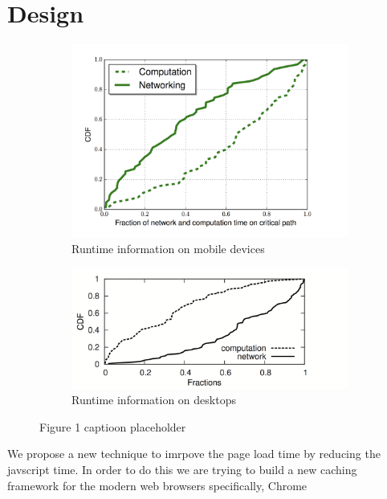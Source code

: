 \section{Design}
\label{sec:design}

\begin{figure}[!h]
\begin{subfigure}[h]{0.5\textwidth}
\centering
\includegraphics[width=\linewidth]{figs/comp_net.png}
\caption{Runtime information on mobile devices}
\label{fig:mobile-runtime}
\end{subfigure}
\begin{subfigure}[h]{0.5\textwidth}
\centering
\includegraphics[width=\linewidth]{figs/comp_net_desk.png}
\caption{Runtime information on desktops}
\label{fig:mobile-runtime}
\end{subfigure}
\caption{{\color{red}Figure 1 captioon placeholder}}
\end{figure}
We propose a new technique to imrpove the page load time by reducing
the javscript time.  In order to do this we are trying to build a new
caching framework for the modern web browsers specifically, Chrome
